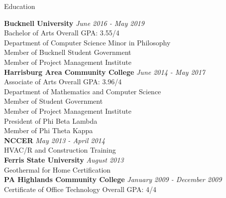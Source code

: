 \documentclass{resume} %
\begin{document}

\begin{rSection}{Education}

{\bf Bucknell University} \hfill {\em June 2016 - May 2019} 
\\ Bachelor of Arts \hfill { Overall GPA: 3.55/4}
\\ Department of Computer Science 
Minor in Philosophy \smallskip \\
Member of Bucknell Student Government \\
Member of Project Management Institute \\

{\bf Harrisburg Area Community College} \hfill {\em June 2014 - May 2017} 
\\ Associate of Arts \hfill { Overall GPA: 3.96/4}
\\ Department of Mathematics and Computer Science 
\smallskip \\
Member of Student Government \\
Member of Project Management Institute \\
President of Phi Beta Lambda \\
Member of Phi Theta Kappa \\

{\bf NCCER} \hfill {\em May 2013 - April 2014} 
\\ HVAC/R and Construction Training \hfill {}
\smallskip \\

{\bf Ferris State University} \hfill {\em August 2013} 
\\ Geothermal for Home Certification \hfill {}
\smallskip \\

{\bf PA Highlands Community College} \hfill {\em January 2009 - December 2009} 
\\ Certificate of Office Technology \hfill { Overall GPA: 4/4}
\smallskip \\

\end{rSection}

\end{document}
